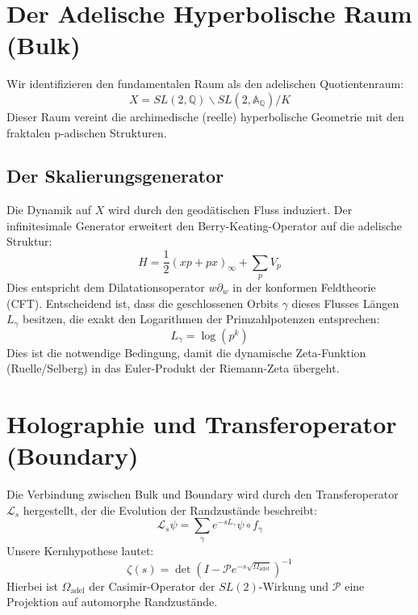 \documentclass[11pt, a4paper]{article}
\begin{document}
	\section{Der Adelische Hyperbolische Raum (Bulk)}
	
	Wir identifizieren den fundamentalen Raum als den adelischen Quotientenraum:
	\begin{equation}
		X = SL(2, \mathbb{Q}) \backslash SL(2, \mathbb{A}_{\mathbb{Q}}) / K
	\end{equation}
	Dieser Raum vereint die archimedische (reelle) hyperbolische Geometrie mit den fraktalen p-adischen Strukturen.
	
	\subsection{Der Skalierungsgenerator}
	Die Dynamik auf $X$ wird durch den geodätischen Fluss induziert. Der infinitesimale Generator erweitert den Berry-Keating-Operator auf die adelische Struktur:
	\begin{equation}
		H = \frac{1}{2}(xp + px)_{\infty} + \sum_{p} V_p
	\end{equation}
	Dies entspricht dem Dilatationsoperator $w \partial_w$ in der konformen Feldtheorie (CFT). Entscheidend ist, dass die geschlossenen Orbits $\gamma$ dieses Flusses Längen $L_\gamma$ besitzen, die exakt den Logarithmen der Primzahlpotenzen entsprechen:
	\begin{equation}
		L_\gamma = \log(p^k)
	\end{equation}
	Dies ist die notwendige Bedingung, damit die dynamische Zeta-Funktion (Ruelle/Selberg) in das Euler-Produkt der Riemann-Zeta übergeht.
	
	\section{Holographie und Transferoperator (Boundary)}
	
	Die Verbindung zwischen Bulk und Boundary wird durch den Transferoperator $\mathcal{L}_s$ hergestellt, der die Evolution der Randzustände beschreibt:
	\begin{equation}
		\mathcal{L}_s \psi = \sum_{\gamma} e^{-s L_\gamma} \psi \circ f_\gamma
	\end{equation}
	Unsere Kernhypothese lautet:
	\begin{equation}
		\zeta(s) = \det(I - \mathcal{P} e^{-s \sqrt{\Omega_{\text{adel}}}})^{-1}
	\end{equation}
	Hierbei ist $\Omega_{\text{adel}}$ der Casimir-Operator der $SL(2)$-Wirkung und $\mathcal{P}$ eine Projektion auf automorphe Randzustände.
	
\end{document}

